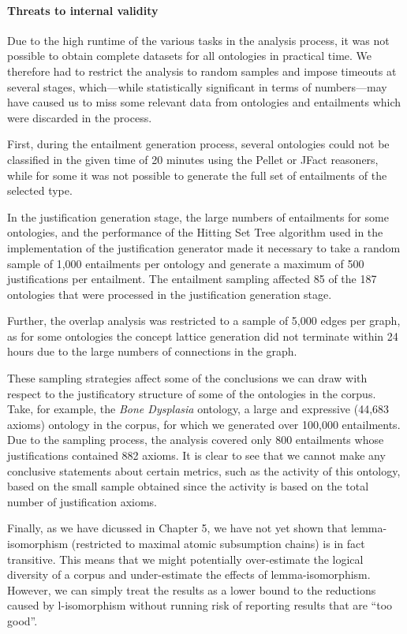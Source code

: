 \paragraph{Threats to internal validity}

Due to the high runtime of the various tasks in the analysis process, it was not possible to obtain complete datasets for all ontologies in practical time. We therefore had to restrict the analysis to random samples and impose timeouts at several stages, which---while statistically significant in terms of numbers---may have caused us to miss some relevant data from ontologies and entailments which were discarded in the process.

First, during the entailment generation process, several ontologies could not be classified in the given time of 20 minutes using the Pellet or JFact reasoners, while for some it was not possible to generate the full set of entailments of the selected type.

In the justification generation stage, the large numbers of entailments for some ontologies, and the performance of the Hitting Set Tree algorithm used in the implementation of the justification generator made it necessary to take a random sample of 1,000 entailments per ontology and generate a maximum of 500 justifications per entailment. The entailment sampling affected 85 of the 187 ontologies that were processed in the justification generation stage.

Further, the overlap analysis was restricted to a sample of 5,000 edges per graph, as for some ontologies the concept lattice generation did not terminate within 24 hours due to the large numbers of connections in the graph.

These sampling strategies affect some of the conclusions we can draw with respect to the justificatory structure of some of the ontologies in the corpus. Take, for example, the \emph{Bone Dysplasia} ontology, a large and expressive (44,683 axioms)  ontology in the corpus, for which we generated over 100,000 entailments. Due to the sampling process, the analysis covered only 800 entailments whose justifications contained 882 axioms. It is clear to see that we cannot make any conclusive statements about certain metrics, such as the activity of this ontology, based on the small sample obtained since the activity is based on the total number of justification axioms.

Finally, as we have dicussed in Chapter 5, we have not yet shown that lemma-isomorphism (restricted to maximal atomic subsumption chains) is in fact transitive. This means that we might potentially over-estimate the logical diversity of a corpus and under-estimate the effects of lemma-isomorphism. However, we can simply treat the results as a lower bound to the reductions caused by l-isomorphism without running risk of reporting results that are \enquote{too good}.

